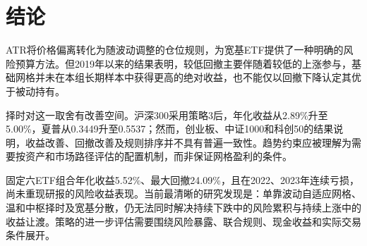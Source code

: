 \documentclass[UTF8,a4paper,11pt,fontset=fandol]{ctexart}
\begin{document}
\section{结论}
ATR将价格偏离转化为随波动调整的仓位规则，为宽基ETF提供了一种明确的风险预算方法。但2019年以来的结果表明，较低回撤主要伴随着较低的上涨参与，基础网格并未在本组长期样本中获得更高的绝对收益，也不能仅以回撤下降认定其优于被动持有。

择时对这一取舍有改善空间。沪深300采用策略3后，年化收益从2.89\%升至5.00\%，夏普从0.3449升至0.5537；然而，创业板、中证1000和科创50的结果说明，收益改善、回撤改善及规则排序并不具有普遍一致性。趋势约束应被理解为需要按资产和市场路径评估的配置机制，而非保证网格盈利的条件。

固定六ETF组合年化收益5.52\%、最大回撤24.09\%，且在2022、2023年连续亏损，尚未重现研报的风险收益表现。当前最清晰的研究发现是：单靠波动自适应网格、温和中枢择时及宽基分散，仍无法同时解决持续下跌中的风险累积与持续上涨中的收益让渡。策略的进一步评估需要围绕风险暴露、联合规则、现金收益和实际交易条件展开。

\appendix
\clearpage
\end{document}

